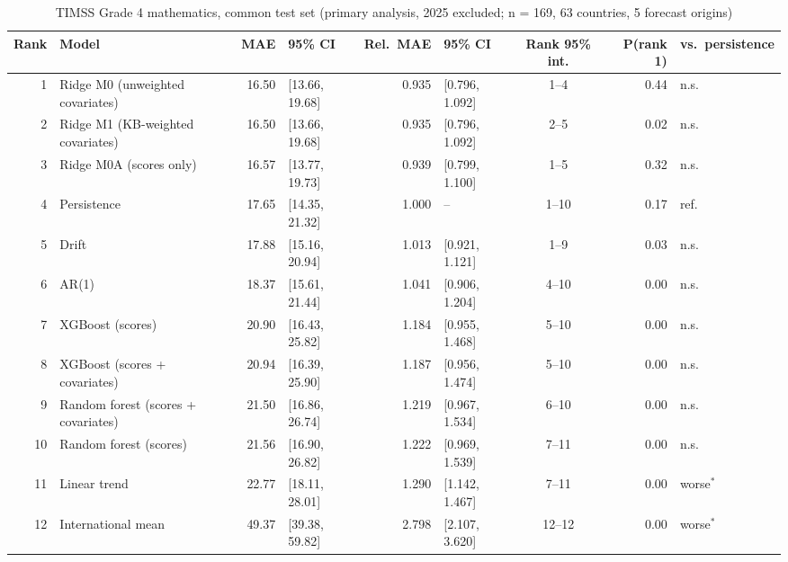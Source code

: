\begin{table}[htbp]
\centering
\footnotesize
\caption{TIMSS Grade 4 mathematics, common test set (primary analysis, 2025 excluded; n = 169, 63 countries, 5 forecast origins)}
\label{tab:A7}
\begin{tabular}{rlrlrlcrl}
\toprule
Rank & Model & MAE & 95\% CI & Rel.\ MAE & 95\% CI & Rank 95\% int. & P(rank 1) & vs.\ persistence \\
\midrule
1 & Ridge M0 (unweighted covariates) & 16.50 & [13.66, 19.68] & 0.935 & [0.796, 1.092] & 1--4 & 0.44 & n.s. \\
2 & Ridge M1 (KB-weighted covariates) & 16.50 & [13.66, 19.68] & 0.935 & [0.796, 1.092] & 2--5 & 0.02 & n.s. \\
3 & Ridge M0A (scores only) & 16.57 & [13.77, 19.73] & 0.939 & [0.799, 1.100] & 1--5 & 0.32 & n.s. \\
4 & Persistence & 17.65 & [14.35, 21.32] & 1.000 & -- & 1--10 & 0.17 & ref. \\
5 & Drift & 17.88 & [15.16, 20.94] & 1.013 & [0.921, 1.121] & 1--9 & 0.03 & n.s. \\
6 & AR(1) & 18.37 & [15.61, 21.44] & 1.041 & [0.906, 1.204] & 4--10 & 0.00 & n.s. \\
7 & XGBoost (scores) & 20.90 & [16.43, 25.82] & 1.184 & [0.955, 1.468] & 5--10 & 0.00 & n.s. \\
8 & XGBoost (scores + covariates) & 20.94 & [16.39, 25.90] & 1.187 & [0.956, 1.474] & 5--10 & 0.00 & n.s. \\
9 & Random forest (scores + covariates) & 21.50 & [16.86, 26.74] & 1.219 & [0.967, 1.534] & 6--10 & 0.00 & n.s. \\
10 & Random forest (scores) & 21.56 & [16.90, 26.82] & 1.222 & [0.969, 1.539] & 7--11 & 0.00 & n.s. \\
11 & Linear trend & 22.77 & [18.11, 28.01] & 1.290 & [1.142, 1.467] & 7--11 & 0.00 & worse$^{*}$ \\
12 & International mean & 49.37 & [39.38, 59.82] & 2.798 & [2.107, 3.620] & 12--12 & 0.00 & worse$^{*}$ \\
\bottomrule
\end{tabular}
\par{}
\end{table}
